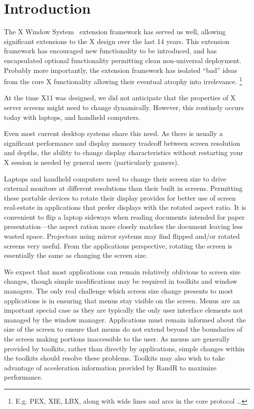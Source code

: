 \documentclass[twocolumn]{article}
\begin{document}
\section{Introduction}

The X Window System~\cite{x} extension framework has served us well, allowing
significant extensions to the X design over the last 14 years.  This
extension framework has encouraged new functionality to be introduced, and
has encapsulated optional functionality permitting clean non-universal
deployment.  Probably more importantly, the extension framework has isolated
``bad'' ideas from the core X functionality allowing their eventual atrophy
into irrelevance. \footnote{E.g. PEX, XIE, LBX, along with wide lines and
arcs in the core protocol \ldots}

At the time X11 was designed, we did not anticipate that the properties of X
server screens might need to change dynamically.  However, this routinely
occurs today with laptops, and handheld computers.

Even most current desktop systems share this need.  As there is usually a
significant performance and display memory tradeoff between screen
resolution and depths, the ability to change display characteristics without
restarting your X session is needed by general users (particularly
gamers).

Laptops and handheld computers need to change their screen size to drive
external monitors at different resolutions than their built in screens.
Permitting these portable devices to rotate their display provides for
better use of screen real-estate in applications that prefer displays with
the rotated aspect ratio.  It is convenient to flip a laptop sideways when
reading documents intended for paper presentation---the aspect ration more
closely matches the document leaving less wasted space.  Projectors using
mirror systems may find flipped and/or rotated screens very useful.  From
the applications perspective, rotating the screen is essentially the same as
changing the screen size.

We expect that most applications can remain relatively oblivious to screen
size changes, though simple modifications may be required in toolkits and
window managers.  The only real challenge which screen size change presents
to most applications is in ensuring that menus stay visible on the screen.
Menus are an important special case as they are typically the only user
interface elements not managed by the window manager.  Applications must
remain informed about the size of the screen to ensure that menus do not
extend beyond the boundaries of the screen making portions inaccessible to
the user.  As menus are generally provided by toolkits, rather than directly
by applications, simple changes within the toolkits should resolve these
problems.  Toolkits may also wish to take advantage of acceleration
information provided by RandR to maximize performance.
\end{document}
